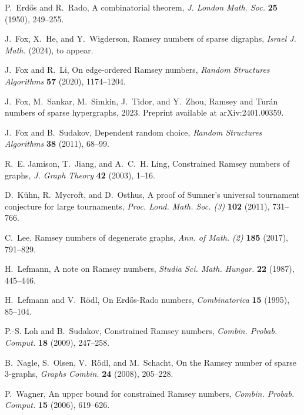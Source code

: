 \documentclass[a4paper,11pt]{article}
\theoremstyle{definition}
\begin{document}
\begin{thebibliography}{10}
P.~Erd\H{o}s and R.~Rado, A combinatorial theorem, \emph{J. London Math. Soc.} \textbf{25} (1950), 249--255.

J.~Fox, X.~He, and Y.~Wigderson, Ramsey numbers of sparse digraphs, \emph{Israel J. Math.}  (2024), to appear.

J.~Fox and R.~Li, On edge-ordered {R}amsey numbers, \emph{Random Structures Algorithms} \textbf{57} (2020), 1174--1204.

J.~Fox, M.~Sankar, M.~Simkin, J.~Tidor, and Y.~Zhou, Ramsey and {T}ur\'an numbers of sparse hypergraphs, 2023. Preprint available at arXiv:2401.00359.

J.~Fox and B.~Sudakov, Dependent random choice, \emph{Random Structures Algorithms} \textbf{38} (2011), 68--99.

R.~E. Jamison, T.~Jiang, and A.~C.~H. Ling, Constrained {R}amsey numbers of graphs, \emph{J. Graph Theory} \textbf{42} (2003), 1--16.

D.~K\"uhn, R.~Mycroft, and D.~Osthus, A proof of {S}umner's universal tournament conjecture for large tournaments, \emph{Proc. Lond. Math. Soc. (3)} \textbf{102} (2011), 731--766.

C.~Lee, Ramsey numbers of degenerate graphs, \emph{Ann. of Math. (2)} \textbf{185} (2017), 791--829.

H.~Lefmann, A note on {R}amsey numbers, \emph{Studia Sci. Math. Hungar.} \textbf{22} (1987), 445--446.

H.~Lefmann and V.~R\"odl, On {E}rdős-{R}ado numbers, \emph{Combinatorica} \textbf{15} (1995), 85--104.

P.-S. Loh and B.~Sudakov, Constrained {R}amsey numbers, \emph{Combin. Probab. Comput.} \textbf{18} (2009), 247--258.

B.~Nagle, S.~Olsen, V.~R\"odl, and M.~Schacht, On the {R}amsey number of sparse 3-graphs, \emph{Graphs Combin.} \textbf{24} (2008), 205--228.

P.~Wagner, An upper bound for constrained {R}amsey numbers, \emph{Combin. Probab. Comput.} \textbf{15} (2006), 619--626.

\end{thebibliography}
\end{document}
